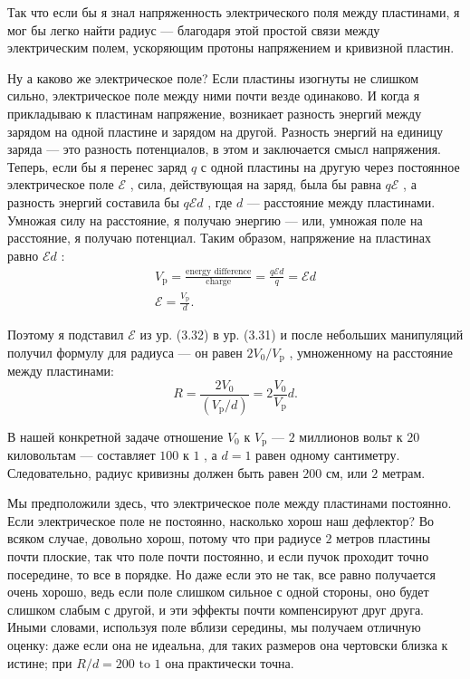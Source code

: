 \documentclass[11pt,oneside]{article}
\providecommand{\emf}{\mathcal{E}}
\begin{document}
Так что если бы я знал напряженность электрического поля между пластинами, я мог бы легко найти радиус --- благодаря этой простой связи между электрическим полем, ускоряющим протоны напряжением и кривизной пластин.\par

Ну а каково же электрическое поле? Если пластины изогнуты не слишком сильно, электрическое поле между ними почти везде одинаково. И когда я прикладываю к пластинам напряжение, возникает разность энергий между зарядом на одной пластине и зарядом на другой. Разность энергий на единицу заряда --- это разность потенциалов, в этом и заключается смысл напряжения. Теперь, если бы я перенес заряд \(q\) с одной пластины на другую через постоянное электрическое поле \(\emf\) , сила, действующая на заряд, была бы равна \(q\emf\) , а разность энергий составила бы \(q\emf d\) , где \(d\) --- расстояние между пластинами. Умножая силу на расстояние, я получаю энергию --- или, умножая поле на расстояние, я получаю потенциал. Таким образом, напряжение на пластинах равно \(\emf d\) : 
\begin{equation*} \begin{gathered} V_\text{p} = \frac{\text{energy difference}}{\text{charge}} = \frac{q\emf d}{q} = \emf d\\[1em] \emf = \frac{V_\text{p}}{d}. \end{gathered} \tag{3.32}
\label{Eq:TIPS:3:32} \end{equation*}
\par

Поэтому я подставил \(\emf\) из ур. (3.32) в ур. (3.31) и после небольших манипуляций получил формулу для радиуса --- он равен \(2V_0/V_\text{p}\) , умноженному на расстояние между пластинами: 
\begin{equation*} \tag{3.33}
\label{Eq:TIPS:3:33} R = \frac{2V_0}{(V_\text{p}/d)} = 2\frac{V_0}{V_\text{p}}d. \end{equation*}
\par

В нашей конкретной задаче отношение \(V_0\) к \(V_\text{p}\) --- \(2\) миллионов вольт к \(20\) киловольтам --- составляет \(100\) к \(1\) , а \(d=1\) равен одному сантиметру. Следовательно, радиус кривизны должен быть равен \(200\) см, или \(2\) метрам.\par

Мы предположили здесь, что электрическое поле между пластинами постоянно. Если электрическое поле не постоянно, насколько хорош наш дефлектор? Во всяком случае, довольно хорош, потому что при радиусе \(2\) метров пластины почти плоские, так что поле почти постоянно, и если пучок проходит точно посередине, то все в порядке. Но даже если это не так, все равно получается очень хорошо, ведь если поле слишком сильное с одной стороны, оно будет слишком слабым с другой, и эти эффекты почти компенсируют друг друга. Иными словами, используя поле вблизи середины, мы получаем отличную оценку: даже если она не идеальна, для таких размеров она чертовски близка к истине; при \(R/d = 200\text{ to }1\) она практически точна.\par
\end{document}
